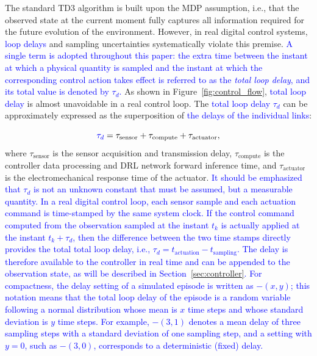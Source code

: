 \documentclass[review]{elsarticle}
\begin{document}
The standard TD3 algorithm is built upon the MDP assumption, i.e., that the observed state at the current moment fully captures all information required for the future evolution of the environment.
However, in real digital control systems, \textcolor{blue}{loop delays} and sampling uncertainties systematically violate this premise.
\textcolor{blue}{A single term is adopted throughout this paper: the extra time between the instant at which a physical quantity is sampled and the instant at which the corresponding control action takes effect is referred to as the \emph{total loop delay}, and its total value is denoted by $\tau_{d}$.}
As shown in Figure~\ref{fig:control_flow}, \textcolor{blue}{total loop delay} is almost unavoidable in a real control loop.
The \textcolor{blue}{total loop delay $\tau_{d}$} can be approximately expressed as the superposition of \textcolor{blue}{the delays of the individual links}:

\begin{equation}\label{eq:total_delay}
\textcolor{blue}{\tau_{d}} = \tau_{\mathrm{sensor}} + \tau_{\mathrm{compute}} + \tau_{\mathrm{actuator}},
\end{equation}
where $\tau_{\mathrm{sensor}}$ is the sensor acquisition and transmission delay, $\tau_{\mathrm{compute}}$ is the controller data processing and DRL network forward inference time, and $\tau_{\mathrm{actuator}}$ is the electromechanical response time of the actuator. \textcolor{blue}{It should be emphasized that $\tau_{d}$ is not an unknown constant that must be assumed, but a measurable quantity. In a real digital control loop, each sensor sample and each actuation command is time-stamped by the same system clock. If the control command computed from the observation sampled at the instant $t_k$ is actually applied at the instant $t_k+\tau_{d}$, then the difference between the two time stamps directly provides the total total loop delay, i.e., $\tau_{d}=t_{\mathrm{actuation}}-t_{\mathrm{sampling}}$. The delay is therefore available to the controller in real time and can be appended to the observation state, as will be described in Section~\ref{sec:controller}.}
\textcolor{blue}{For compactness, the delay setting of a simulated episode is written as $-(x,y)$; this notation means that the total loop delay of the episode is a random variable following a normal distribution whose mean is $x$ time steps and whose standard deviation is $y$ time steps. For example, $-(3,1)$ denotes a mean delay of three sampling steps with a standard deviation of one sampling step, and a setting with $y=0$, such as $-(3,0)$, corresponds to a deterministic (fixed) delay.}
\end{document}
